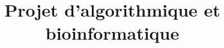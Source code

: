 \documentclass[11pt]{article}
\begin{document}
\title{Projet d'algorithmique et bioinformatique}
\maketitle
\end{document}
